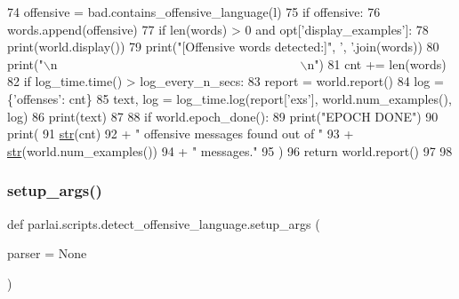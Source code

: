 \begin{DoxyCode}
74                 offensive = bad.contains\_offensive\_language(l)
75                 \textcolor{keywordflow}{if} offensive:
76                     words.append(offensive)
77         \textcolor{keywordflow}{if} len(words) > 0 \textcolor{keywordflow}{and} opt[\textcolor{stringliteral}{'display\_examples'}]:
78             print(world.display())
79             print(\textcolor{stringliteral}{"[Offensive words detected:]"}, \textcolor{stringliteral}{', '}.join(words))
80             print(\textcolor{stringliteral}{"\(\backslash\)n~~~~~~~~~~~~~~~~~~~~~~~~~~~~~~~~~~~~~~~\(\backslash\)n"})
81         cnt += len(words)
82         \textcolor{keywordflow}{if} log\_time.time() > log\_every\_n\_secs:
83             report = world.report()
84             log = \{\textcolor{stringliteral}{'offenses'}: cnt\}
85             text, log = log\_time.log(report[\textcolor{stringliteral}{'exs'}], world.num\_examples(), log)
86             print(text)
87 
88     \textcolor{keywordflow}{if} world.epoch\_done():
89         print(\textcolor{stringliteral}{"EPOCH DONE"})
90     print(
91         \hyperlink{namespacegenerate__task__READMEs_a5b88452ffb87b78c8c85ececebafc09f}{str}(cnt)
92         + \textcolor{stringliteral}{" offensive messages found out of "}
93         + \hyperlink{namespacegenerate__task__READMEs_a5b88452ffb87b78c8c85ececebafc09f}{str}(world.num\_examples())
94         + \textcolor{stringliteral}{" messages."}
95     )
96     \textcolor{keywordflow}{return} world.report()
97 
98 
\end{DoxyCode}
\mbox{\label{namespaceparlai_1_1scripts_1_1detect__offensive__language_ab3f20447fd2442afdcd45dd77b619378}} 
\subsubsection{\texorpdfstring{setup\+\_\+args()}{setup\_args()}}
{\footnotesize\ttfamily def parlai.\+scripts.\+detect\+\_\+offensive\+\_\+language.\+setup\+\_\+args (\begin{DoxyParamCaption}\item[{}]{parser = {\ttfamily None} }\end{DoxyParamCaption})}



